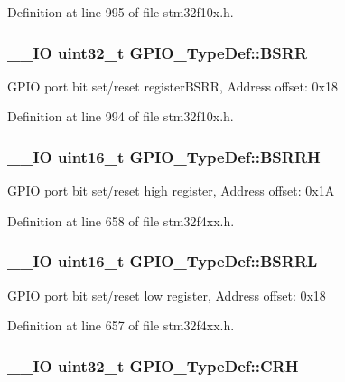 Definition at line 995 of file stm32f10x.\-h.

\hypertarget{struct_g_p_i_o___type_def_acd6f21e08912b484c030ca8b18e11cd6}{
\subsubsection[{B\-S\-R\-R}]{\setlength{\rightskip}{0pt plus 5cm}\-\_\-\-\_\-\-I\-O {\bf uint32\-\_\-t} G\-P\-I\-O\-\_\-\-Type\-Def\-::\-B\-S\-R\-R}}\label{struct_g_p_i_o___type_def_acd6f21e08912b484c030ca8b18e11cd6}
G\-P\-I\-O port bit set/reset register\-B\-S\-R\-R, Address offset\-: 0x18 

Definition at line 994 of file stm32f10x.\-h.

\hypertarget{struct_g_p_i_o___type_def_ad4b5f8bc936e26e3980686d2aba9d882}{
\subsubsection[{B\-S\-R\-R\-H}]{\setlength{\rightskip}{0pt plus 5cm}\-\_\-\-\_\-\-I\-O {\bf uint16\-\_\-t} G\-P\-I\-O\-\_\-\-Type\-Def\-::\-B\-S\-R\-R\-H}}\label{struct_g_p_i_o___type_def_ad4b5f8bc936e26e3980686d2aba9d882}
G\-P\-I\-O port bit set/reset high register, Address offset\-: 0x1\-A 

Definition at line 658 of file stm32f4xx.\-h.

\hypertarget{struct_g_p_i_o___type_def_ad2528bbb921532be8116534651b1faee}{
\subsubsection[{B\-S\-R\-R\-L}]{\setlength{\rightskip}{0pt plus 5cm}\-\_\-\-\_\-\-I\-O {\bf uint16\-\_\-t} G\-P\-I\-O\-\_\-\-Type\-Def\-::\-B\-S\-R\-R\-L}}\label{struct_g_p_i_o___type_def_ad2528bbb921532be8116534651b1faee}
G\-P\-I\-O port bit set/reset low register, Address offset\-: 0x18 

Definition at line 657 of file stm32f4xx.\-h.

\hypertarget{struct_g_p_i_o___type_def_afe53502a3dbf9e7dcf9ac83f67ac481d}{
\subsubsection[{C\-R\-H}]{\setlength{\rightskip}{0pt plus 5cm}\-\_\-\-\_\-\-I\-O {\bf uint32\-\_\-t} G\-P\-I\-O\-\_\-\-Type\-Def\-::\-C\-R\-H}}\label{struct_g_p_i_o___type_def_afe53502a3dbf9e7dcf9ac83f67ac481d}


